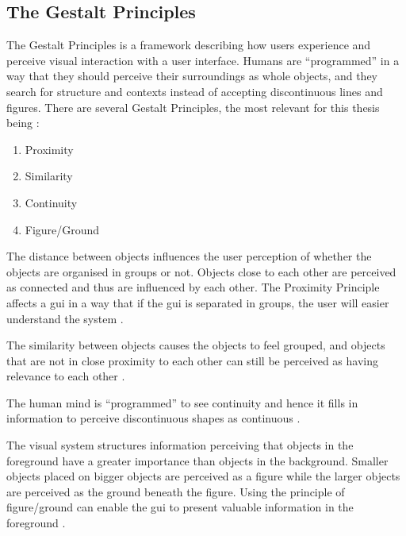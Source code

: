 \newpage
\subsection{The Gestalt Principles}
\label{sec:gestaltprinciples}
The Gestalt Principles is a framework describing how users experience and perceive visual interaction with a user interface. Humans are ``programmed'' in a way that they should perceive their surroundings as whole objects, and they search for structure and contexts instead of accepting discontinuous lines and figures. There are several Gestalt Principles, the most relevant for this thesis being \cite{johnson}:
\begin{enumerate}
     \item Proximity
     \item Similarity
     \item Continuity
     \item Figure/Ground
 \end{enumerate}

\label{sec:proximity}
The distance between objects influences the user perception of whether the objects are organised in groups or not. Objects close to each other are perceived as connected and thus are influenced by each other. The Proximity Principle affects a \acrfull{gui} in a way that if the \acrshort{gui} is separated in groups, the user will easier understand the system \cite{johnson}.

\label{sec:similarity}
The similarity between objects causes the objects to feel grouped, and objects that are not in close proximity to each other can still be perceived as having relevance to each other \cite{johnson}.

\newpage
{}
\label{sec:continuity}
The human mind is ``programmed'' to see continuity and hence it fills in information to perceive discontinuous shapes as continuous \cite{johnson}.

\label{sec:figureground}
The visual system structures information perceiving that objects in the foreground have a greater importance than objects in the background. Smaller objects placed on bigger objects are perceived as a figure while the larger objects are perceived as the ground beneath the figure. Using the principle of figure/ground can enable the \acrshort{gui} to present valuable information in the foreground \cite{johnson}.